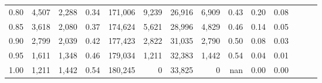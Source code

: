 \begin{tabular}{rrrrrrrrrrrrrr}
0.80 &   4,507 &  2,288 &  0.34 &  171,006 &    9,239 &  26,916 &   6,909 &  0.43 &  0.20 &      0.08 \\
0.85 &   3,618 &  2,080 &  0.37 &  174,624 &    5,621 &  28,996 &   4,829 &  0.46 &  0.14 &      0.05 \\
0.90 &   2,799 &  2,039 &  0.42 &  177,423 &    2,822 &  31,035 &   2,790 &  0.50 &  0.08 &      0.03 \\
0.95 &   1,611 &  1,348 &  0.46 &  179,034 &    1,211 &  32,383 &   1,442 &  0.54 &  0.04 &      0.01 \\
1.00 &   1,211 &  1,442 &  0.54 &  180,245 &        0 &  33,825 &       0 &   nan &  0.00 &      0.00 \\
\bottomrule
\end{tabular}
